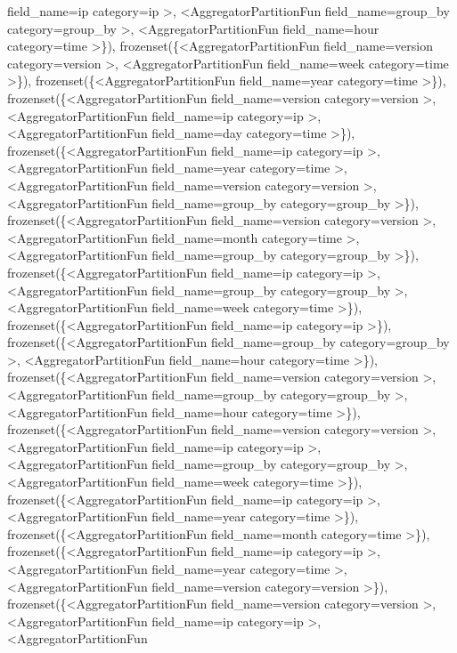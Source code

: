 \documentclass[letterpaper,10pt,english]{sphinxmanual}
\begin{document}
\begin{fulllineitems}
\begin{fulllineitems}
field\_name=ip category=ip \textgreater{}, \textless{}AggregatorPartitionFun field\_name=group\_by category=group\_by \textgreater{}, \textless{}AggregatorPartitionFun field\_name=hour category=time \textgreater{}\}), frozenset(\{\textless{}AggregatorPartitionFun field\_name=version category=version \textgreater{}, \textless{}AggregatorPartitionFun field\_name=week category=time \textgreater{}\}), frozenset(\{\textless{}AggregatorPartitionFun field\_name=year category=time \textgreater{}\}), frozenset(\{\textless{}AggregatorPartitionFun field\_name=version category=version \textgreater{}, \textless{}AggregatorPartitionFun field\_name=ip category=ip \textgreater{}, \textless{}AggregatorPartitionFun field\_name=day category=time \textgreater{}\}), frozenset(\{\textless{}AggregatorPartitionFun field\_name=ip category=ip \textgreater{}, \textless{}AggregatorPartitionFun field\_name=year category=time \textgreater{}, \textless{}AggregatorPartitionFun field\_name=version category=version \textgreater{}, \textless{}AggregatorPartitionFun field\_name=group\_by category=group\_by \textgreater{}\}), frozenset(\{\textless{}AggregatorPartitionFun field\_name=version category=version \textgreater{}, \textless{}AggregatorPartitionFun field\_name=month category=time \textgreater{}, \textless{}AggregatorPartitionFun field\_name=group\_by category=group\_by \textgreater{}\}), frozenset(\{\textless{}AggregatorPartitionFun field\_name=ip category=ip \textgreater{}, \textless{}AggregatorPartitionFun field\_name=group\_by category=group\_by \textgreater{}, \textless{}AggregatorPartitionFun field\_name=week category=time \textgreater{}\}), frozenset(\{\textless{}AggregatorPartitionFun field\_name=ip category=ip \textgreater{}\}), frozenset(\{\textless{}AggregatorPartitionFun field\_name=group\_by category=group\_by \textgreater{}, \textless{}AggregatorPartitionFun field\_name=hour category=time \textgreater{}\}), frozenset(\{\textless{}AggregatorPartitionFun field\_name=version category=version \textgreater{}, \textless{}AggregatorPartitionFun field\_name=group\_by category=group\_by \textgreater{}, \textless{}AggregatorPartitionFun field\_name=hour category=time \textgreater{}\}), frozenset(\{\textless{}AggregatorPartitionFun field\_name=version category=version \textgreater{}, \textless{}AggregatorPartitionFun field\_name=ip category=ip \textgreater{}, \textless{}AggregatorPartitionFun field\_name=group\_by category=group\_by \textgreater{}, \textless{}AggregatorPartitionFun field\_name=week category=time \textgreater{}\}), frozenset(\{\textless{}AggregatorPartitionFun field\_name=ip category=ip \textgreater{}, \textless{}AggregatorPartitionFun field\_name=year category=time \textgreater{}\}), frozenset(\{\textless{}AggregatorPartitionFun field\_name=month category=time \textgreater{}\}), frozenset(\{\textless{}AggregatorPartitionFun field\_name=ip category=ip \textgreater{}, \textless{}AggregatorPartitionFun field\_name=year category=time \textgreater{}, \textless{}AggregatorPartitionFun field\_name=version category=version \textgreater{}\}), frozenset(\{\textless{}AggregatorPartitionFun field\_name=version category=version \textgreater{}, \textless{}AggregatorPartitionFun field\_name=ip category=ip \textgreater{}, \textless{}AggregatorPartitionFun 
\end{fulllineitems}
\end{fulllineitems}
\end{document}
